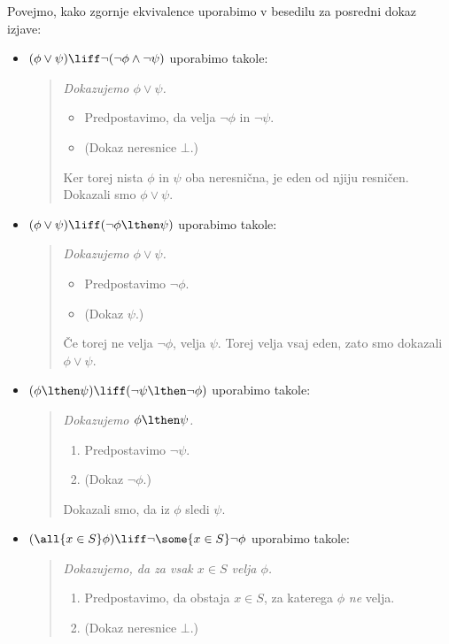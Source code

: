 Povejmo, kako zgornje ekvivalence uporabimo v besedilu za posredni
dokaz izjave:
%
\begin{itemize}
\item $(\phi \lor \psi) \liff \lnot (\lnot\phi \land \lnot\psi)$
  uporabimo takole:
  \begin{quote}
    \it
    Dokazujemo $\phi \lor \psi$.
    \begin{itemize}
    \item[] Predpostavimo, da velja $\lnot\phi$ in $\lnot\psi$.
    \item[] (Dokaz neresnice $\bot$.)
    \end{itemize}
    Ker torej nista $\phi$ in $\psi$ oba neresnična, je eden od njiju
    resničen. Dokazali smo $\phi \lor \psi$.
  \end{quote}
\item $(\phi \lor \psi) \liff (\lnot\phi \lthen \psi)$ uporabimo
  takole:
  \begin{quote}
    \it
    Dokazujemo $\phi \lor \psi$.
    \begin{itemize}
    \item[] Predpostavimo $\lnot\phi$.
    \item[] (Dokaz $\psi$.)
    \end{itemize}
    Če torej ne velja $\lnot\phi$, velja $\psi$. Torej velja vsaj
    eden, zato smo dokazali $\phi \lor \psi$.
  \end{quote}
\item $(\phi \lthen \psi) \liff (\lnot\psi \lthen \lnot\phi)$
  uporabimo takole:
  \begin{quote}
    \it
    Dokazujemo $\phi \lthen \psi$.
    \begin{enumerate}
    \item Predpostavimo $\lnot\psi$.
    \item (Dokaz $\lnot\phi$.)
    \end{enumerate}
    Dokazali smo, da iz $\phi$ sledi $\psi$.
  \end{quote}
\item $(\all{x \in S} \phi) \liff \lnot \some{x \in S} \lnot \phi$
  uporabimo takole:
  \begin{quote}
    \it
    Dokazujemo, da za vsak $x \in S$ velja $\phi$.
    \begin{enumerate}
    \item Predpostavimo, da obstaja $x \in S$, za katerega $\phi$
      \emph{ne} velja.
    \item (Dokaz neresnice $\bot$.)

\end{enumerate}
\end{quote}
\end{itemize}
